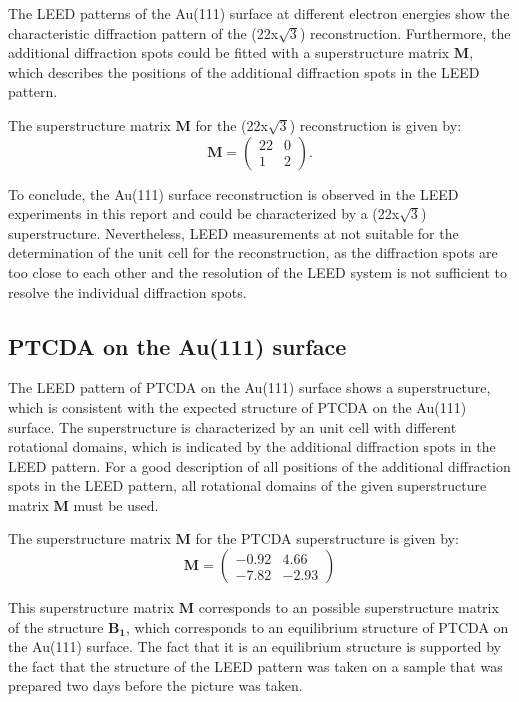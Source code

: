\documentclass[fontsize=11pt,reqno,a4paper,oneside]{scrartcl}
\begin{document}
The \ac{LEED} patterns of the Au(111) surface at different electron energies show the characteristic diffraction pattern of the (22x$\sqrt{3}$) reconstruction. Furthermore, the additional diffraction spots could be fitted with a superstructure matrix $\mathbf{M}$, which describes the positions of the additional diffraction spots in the \ac{LEED} pattern.

The superstructure matrix $\mathbf{M}$ for the (22x$\sqrt{3}$) reconstruction is given by:
\begin{equation*}
    \mathbf{M} =
\begin{pmatrix}
22 & 0 \\
1 & 2
\end{pmatrix}.
\end{equation*}

To conclude, the Au(111) surface reconstruction is observed in the \ac{LEED} experiments in this report and could be characterized by a (22x$\sqrt{3}$) superstructure. Nevertheless, \ac{LEED} measurements at not suitable for the determination of the unit cell for the reconstruction, as the diffraction spots are too close to each other and the resolution of the \ac{LEED} system is not sufficient to resolve the individual diffraction spots.


\subsection{PTCDA on the Au(111) surface}

The \ac{LEED} pattern of \ac{PTCDA} on the Au(111) surface shows a superstructure, which is consistent with the expected structure of \ac{PTCDA} on the Au(111) surface.\autocite{Kilian2002,Kilian2006} The superstructure is characterized by an unit cell with different rotational domains, which is indicated by the additional diffraction spots in the \ac{LEED} pattern. For a good description of all positions of the additional diffraction spots in the \ac{LEED} pattern, all rotational domains of the given superstructure matrix $\mathbf{M}$ must be used.

The superstructure matrix $\mathbf{M}$ for the \ac{PTCDA} superstructure is given by:
\begin{equation*}
    \mathbf{M} =
\begin{pmatrix}
-0.92 & 4.66 \\
-7.82 & -2.93
\end{pmatrix}
\end{equation*}

This superstructure matrix $\mathbf{M}$ corresponds to an possible superstructure matrix of the structure $\mathbf{B_1}$, which corresponds to an equilibrium structure of \ac{PTCDA} on the Au(111) surface.\autocite{Kilian2002,Kilian2006} The fact that it is an equilibrium structure is supported by the fact that the structure of the \ac{LEED} pattern was taken on a sample that was prepared two days before the picture was taken.
\end{document}
